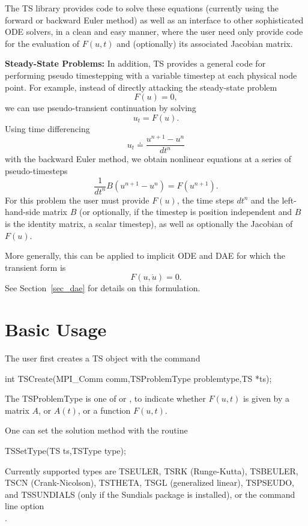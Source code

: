 The TS library provides code to solve these equations (currently 
using the forward or backward Euler method) as well as an interface to 
other sophisticated ODE solvers, in a clean and easy manner,
where the user need only provide code for the evaluation of $ F(u,t) $ and 
(optionally) its associated Jacobian matrix.

\vspace{.2cm}

\noindent
{\bf Steady-State Problems:} 
In addition, TS provides a general code for performing pseudo timestepping
with a variable timestep at each physical node point. For example, instead of
directly attacking the steady-state problem
\[
           F(u) = 0,
\]
we can use pseudo-transient continuation by solving
\[
           u_t = F(u).
\]
Using time differencing 
\[
   u_t \doteq \frac{{u^{n+1}} - {u^{n}} }{dt^{n}}
\]
with the backward Euler method, we obtain
nonlinear equations at a series of pseudo-timesteps
\[
           \frac{1}{dt^n} B (u^{n+1} - u^{n} ) = F(u^{n+1}).
\]
For this problem the user must provide $F(u)$,
the time steps $dt^{n}$ and the left-hand-side matrix $B$
(or optionally, if the timestep is position independent and $B$ is the
identity matrix,
a scalar timestep), as well as optionally the Jacobian of $F(u)$. 

More generally, this can be applied to implicit ODE and DAE for which
the transient form is
\[
  F(u,\dot{u}) = 0.
\]
See Section~\ref{sec_dae} for details on this formulation.

\section{Basic Usage}

The user first creates a TS object with the command
\begin{tabbing}
  int TSCreate(MPI\_Comm comm,TSProblemType problemtype,TS *ts);
\end{tabbing}
The TSProblemType 
is one of  or ,
to indicate whether $ F(u,t) $ is given by a matrix $ A $, or $ A(t) $, or a
function $ F(u,t). $

One can set the solution method with the routine
\begin{tabbing}
 TSSetType(TS ts,TSType type);
\end{tabbing}
Currently supported types are TSEULER, TSRK (Runge-Kutta), 
TSBEULER, TSCN (Crank-Nicolson), TSTHETA, TSGL (generalized linear), TSPSEUDO, and  
TSSUNDIALS (only if the Sundials package is installed),  
or the command line option \\
.
 


